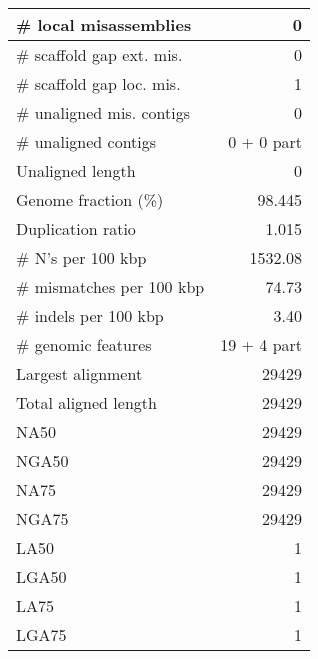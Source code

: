 \documentclass[12pt,a4paper]{article}
\begin{document}
\begin{table}[ht]
\begin{center}
\begin{tabular}{|l*{1}{|r}|}
\# local misassemblies & 0 \\ \hline
\# scaffold gap ext. mis. & 0 \\ \hline
\# scaffold gap loc. mis. & 1 \\ \hline
\# unaligned mis. contigs & 0 \\ \hline
\# unaligned contigs & 0 + 0 part \\ \hline
Unaligned length & 0 \\ \hline
Genome fraction (\%) & 98.445 \\ \hline
Duplication ratio & 1.015 \\ \hline
\# N's per 100 kbp & 1532.08 \\ \hline
\# mismatches per 100 kbp & 74.73 \\ \hline
\# indels per 100 kbp & 3.40 \\ \hline
\# genomic features & 19 + 4 part \\ \hline
Largest alignment & 29429 \\ \hline
Total aligned length & 29429 \\ \hline
NA50 & 29429 \\ \hline
NGA50 & 29429 \\ \hline
NA75 & 29429 \\ \hline
NGA75 & 29429 \\ \hline
LA50 & 1 \\ \hline
LGA50 & 1 \\ \hline
LA75 & 1 \\ \hline
LGA75 & 1 \\ \hline
\end{tabular}
\end{center}
\end{table}
\end{document}
